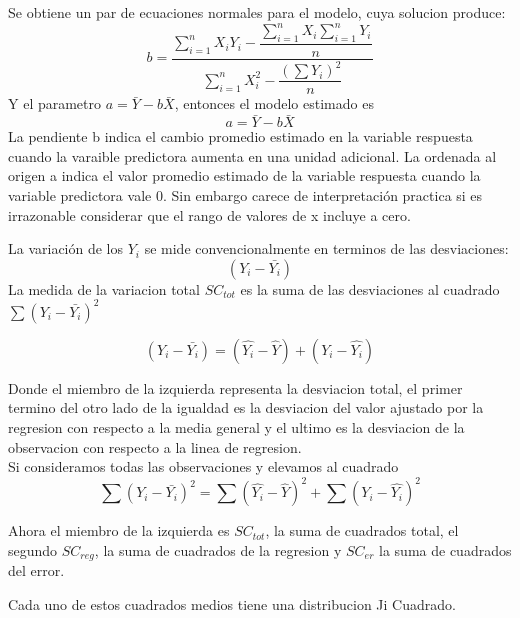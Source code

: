 \documentclass[10pt,a4paper]{article}
\begin{document}
Se obtiene un par de ecuaciones normales para el modelo, cuya solucion produce:
 \begin{equation}
	 b=\dfrac{\sum_{i=1}^n X_i Y_i - \dfrac{\sum_{i=1}^nX_i \sum_{i=1}^nY_i}{n}}{\sum_{i=1}^nX_i^2-\dfrac{\left(\sum Y_i\right)^2}{n}}
 \end{equation}
 Y el parametro $a=\bar{Y}-b\bar{X}$, entonces el modelo estimado es
 \begin{equation}
	 a=\bar{Y}-b\bar{X}
 \end{equation}
La pendiente b indica el cambio promedio estimado en la variable respuesta cuando la varaible predictora aumenta en una unidad adicional. La ordenada al origen a indica el valor promedio estimado de la variable respuesta cuando la variable predictora vale 0. Sin embargo carece de interpretación practica si es irrazonable considerar que el rango de valores de x incluye a cero.

La variación de los $Y_i$ se mide convencionalmente en terminos de las desviaciones:
\begin{equation}
	\left(Y_i-\bar{Y_i}\right)
\end{equation}
La medida de la variacion total $SC_{tot}$ es la suma de las desviaciones al cuadrado $\sum\left(Y_i-\bar{Y_i}\right)^2$

\begin{equation}
	\left(Y_i-\bar{Y_i}\right)=\left(\hat{Y_i}-\hat{Y}\right)+\left(Y_i-\hat{Y_i}\right)
\end{equation}

Donde el miembro de la izquierda representa la desviacion total, el primer termino del otro lado de la igualdad es la desviacion del valor ajustado por la regresion con respecto a la media general y el ultimo es la desviacion de la observacion con respecto a la linea de regresion.\\

Si consideramos todas las observaciones y elevamos al cuadrado
\begin{equation}
	\sum \left(Y_i-\bar{Y_i}\right)^2=\sum \left(\hat{Y_i}-\hat{Y}\right)^2+\sum \left(Y_i-\hat{Y_i}\right)^2
\end{equation}

Ahora el miembro de la izquierda es $SC_{tot}$, la suma de cuadrados total, el segundo $SC_{reg}$, la suma de cuadrados de la regresion y $SC_{er}$ la suma de cuadrados del error.

Cada uno de estos cuadrados medios tiene una distribucion Ji Cuadrado.
\end{document}
